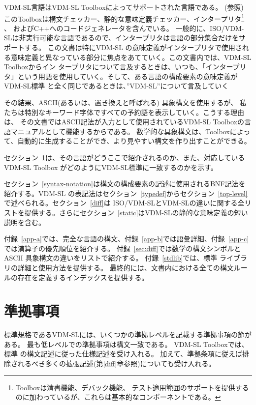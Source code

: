 \documentclass[\pformat,12pt]{jarticle}
\newcommand{\vdmslpp}[2]{%
#1
}
\newcommand{\vdmsl}{VDM-SL}
\newcommand{\vdmpp}{VDM++}
\begin{document}
VDM-SL言語はVDM-SL Toolboxによってサポートされた言語である。
(\cite{UserMan-SCSK}参照)
このToolboxは構文チェッカー、静的な意味定義チェッカー、インタープリタ\footnote{Toolboxは清書機能、デバック機能、
テスト適用範囲のサポートを提供するのに加わっているが、これらは基本的なコンポーネントである。} 、
およびC++へのコードジェネレータを含んでいる。
一般的に、ISO/VDM-SLは非実行可能な言語であるので、インタープリタは言語の部分集合だけをサポートする。
この文書は特にVDM-SL の意味定義がインタープリタで使用され
る意味定義と異なっている部分に焦点をあてていく。この文書内では、VDM-SL Toolboxからイン
タープリタについて言及するときは、いつも、「インタープリ
タ」という用語を使用していく。そして、ある言語の構成要素の意味定義がVDM-SL標準
と全く同じであるときは、”VDM-SL”について言及していく

その結果、ASCII(あるいは、置き換えと呼ばれる) 具象構文を使用するが、
私たちは特別なキーワード字体ですべての予約語を表示していく。こうする理由は、
その文書ではASCII記法が入力として使用されているVDM-SL Toolboxの言語マニュアルとして機能するからである。
数学的な具象構文は、Toolboxによって、自動的に生成することができ、より見やすい構文を作り出すことができる。

セクション~\ref{conformance}は、その言語がどうここで紹介されるのか、また、対応しているVDM-SL Toolbox
がどのようにVDM-SL標準に一致するのかを示す。

セクション~\ref{syntax-notation}は構文の構成要素の記述に使用されるBNF記法を紹介する。VDM-SL
の表記法はセクション~\ref{typedef}からセクション~\ref{top-level}で述べられる。セクション~\ref{diff}は
ISO/VDM-SLとVDM-SLの違いに関する全リストを提供する。さらにセクション~\ref{static}はVDM-SLの静的な意味定義の短い説明を含む。

付録~\ref{app-a}では、完全な言語の構文、付録~\ref{app-b}では語彙詳細、付録~\ref{app-c}では演算子の優先順位を紹介する。
付録~\ref{sec:diff}では数学の構文シンボルとASCII 具象構文の違いをリストで紹介する。
付録~\ref{stdlib}では、標準 ライブラリの詳細と使用方法を提供する。
最終的には、文書内における全ての構文ルールの存在を定義するインデックスを提供する。


\section{準拠事項}
\label{conformance}

標準規格であるVDM-SLには、いくつかの準拠レベルを記載する準拠事項の節がある。
最も低レベルでの準拠事項は構文一致である。
\vdmslpp{\vdmsl}{\vdmpp} Toolboxでは、\vdmslpp{標準}{標準のもの、例外は第\ref{diff}章にて記述される}の構文記述に従った仕様記述を受け入れる。
加えて、準拠条項に従えば排除されるべき多くの拡張記述(第\ref{diff}章参照)についても受け入れる。
\end{document}
